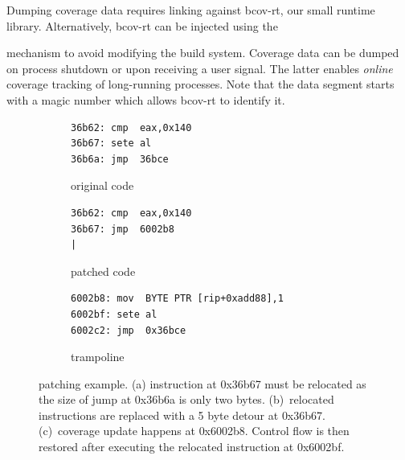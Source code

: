 Dumping coverage data requires linking against \textsf{bcov-rt}, our small runtime library.
Alternatively, \textsf{bcov-rt} can be injected using the 
{ mechanism to avoid modifying the build system. 
Coverage data can be dumped on process shutdown or upon receiving a user signal.
The latter enables \textit{online} coverage tracking of long-running processes. 
Note that the data segment starts with a magic number which allows \textsf{bcov-rt} to identify it.

\begin{figure}[t!]
\centering
\vspace{-4pt}    
\begin{subfigure}[t]{0.23\textwidth}
	\begin{lstlisting}[style=custom-x64]
36b62: cmp  eax,0x140
36b67: sete al
36b6a: jmp  36bce
	\end{lstlisting}
	\vspace{-3pt}
	\caption{original code}
	\label{fig:2:original}
\end{subfigure}
\hfill
\begin{subfigure}[t]{0.23\textwidth}
	\begin{lstlisting}[style=custom-x64]
36b62: cmp  eax,0x140
36b67: jmp  6002b8
|
	\end{lstlisting}
	\vspace{-3pt}
	\caption{patched code}
	\label{fig:2:patch}
\end{subfigure}
\hfill
\begin{subfigure}[t]{0.38\textwidth}
	\vspace{-3pt}     
	\begin{lstlisting}[style=custom-x64]
6002b8: mov  BYTE PTR [rip+0xadd88],1
6002bf: sete al
6002c2: jmp  0x36bce
	\end{lstlisting}
	\vspace{-2pt}
	\caption{trampoline}
	\label{fig:2:trampoline}
\end{subfigure}

\caption{{\bcov} patching example. 
	(a) instruction at \textsf{0x36b67} must be relocated as the size of jump at \textsf{0x36b6a} is only two bytes. 
	(b)~relocated instructions are replaced with a 5 byte detour at \textsf{0x36b67}. 
	(c)~coverage update happens at \textsf{0x6002b8}. 
	Control flow is then restored after executing the relocated instruction at \textsf{0x6002bf}.}
	\label{fig:patch-example}
\end{figure}

}
